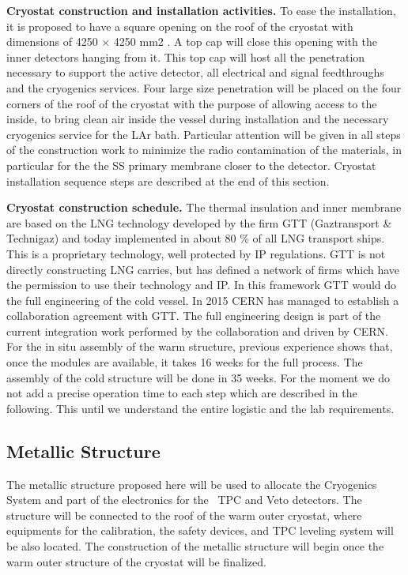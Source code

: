 {\bf Cryostat construction and installation activities.} To ease the installation, it is proposed to
have a square opening on the roof of the cryostat with dimensions of 4250 × 4250 mm2 . A
top cap will close this opening with the inner detectors hanging from it. This top cap will host
all the penetration necessary to support the active detector, all electrical and signal
feedthroughs and the cryogenics services.
Four large size penetration will be placed on the four corners of the roof of the cryostat with
the purpose of allowing access to the inside, to bring clean air inside the vessel during
installation and the necessary cryogenics service for the LAr bath.
Particular attention will be given in all steps of the construction work to minimize the radio
contamination of the materials, in particular for the the SS primary membrane closer to the
detector. Cryostat installation sequence steps are described at the end of this section.

{\bf Cryostat construction schedule.} The thermal insulation and inner membrane are based on
the LNG technology developed by the firm GTT (Gaztransport \& Technigaz) and today
implemented in about 80 \% of all LNG transport ships. This is a proprietary technology, well
protected by IP regulations. GTT is not directly constructing LNG carries, but has defined a
network of firms which have the permission to use their technology and IP. In this framework
GTT would do the full engineering of the cold vessel. In 2015 CERN has managed to
establish a collaboration agreement with GTT. The full engineering design is part of the
current integration work performed by the collaboration and driven by CERN.
For the in situ assembly of the warm structure, previous experience shows that, once the
modules are available, it takes 16 weeks for the full process. The assembly of the cold
structure will be done in 35 weeks. For the moment we do not add a precise operation time to
each step which are described in the following. This until we understand the entire logistic
and the lab requirements.

\subsection{Metallic Structure}
\label{sec:MetallicStructure}

The metallic structure proposed here will be used to allocate the Cryogenics System and part
of the electronics for the \DSks\ TPC and Veto detectors. The structure will be
connected to the roof of the warm outer cryostat, where equipments for the calibration, the
safety devices, and TPC leveling system will be also located. The construction of the metallic
structure will begin once the warm outer structure of the cryostat will be finalized.

